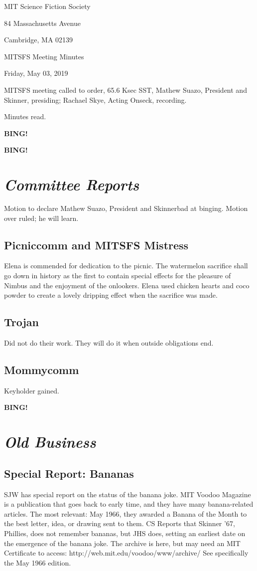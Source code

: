 \documentclass[10pt]{article}
\newcommand{\bing}{{\bf BING!} }
\newcommand{\goto}[1]{\bing \vskip 12pt \section*{{\em{#1}}}}
\newcommand{\skinner}{Mathew Suazo, President and Skinner}
\newcommand{\onseck}{Rachael Skye, Acting Onseck}
\newcommand{\meetingdate}{Friday, May 03, 2019 }
\begin{document}
\begin{center}

MIT Science Fiction Society

84 Massachusetts Avenue

Cambridge, MA 02139

\vspace{12pt}

MITSFS Meeting Minutes

\meetingdate

\end{center}

\vspace{18pt}

\setlength{\parskip}{6pt}

\noindent
MITSFS meeting called to order, 65.6 Ksec SST,
\skinner, presiding; \onseck, recording.

Minutes read.

\bing

\goto{Committee Reports}

Motion to declare \skinner bad at binging. Motion over ruled; he will learn.

\subsection{Picniccomm and MITSFS Mistress}
Elena is commended for dedication to the picnic. The watermelon sacrifice shall go down in history as the first to contain special effects for the pleasure of Nimbus and the enjoyment of the onlookers. Elena used chicken hearts and coco powder to create a lovely dripping effect when the sacrifice was made.

\subsection{Trojan}
Did not do their work. They will do it when outside obligations end.

\subsection{Mommycomm}
Keyholder gained.

\goto{Old Business}

\subsection{Special Report: Bananas}

SJW has special report on the status of the banana joke.
\vspace{18pt}
MIT Voodoo Magazine is a publication that goes back to early time, and they have many banana-related articles. The most relevant: May 1966, they awarded a Banana of the Month to the best letter, idea, or drawing sent to them. CS Reports that Skinner '67, Phillies, does not remember bananas, but JHS does, setting an earliest date on the emergence of the banana joke. 
\vspace{12pt}
The archive is here, but may need an MIT Certificate to access:
\vspace{12pt}
http://web.mit.edu/voodoo/www/archive/
\vspace{12pt}
See specifically the May 1966 edition.
\end{document}
